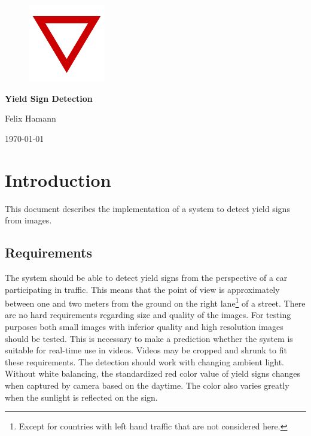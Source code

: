 \documentclass{report}
\begin{document}
%
%


{\centering

  \begin{figure}
    \vspace{3cm}

    \centering
    \includegraphics[width=0.3\textwidth]{src/yield}

    \vspace{4cm}
  \end{figure}


  {\Huge\textbf{Yield Sign Detection}}
  \vspace{.4cm}

  Felix Hamann

  \vspace{.2cm}

  \today

}


%
%

\tableofcontents


\chapter{Introduction}

This document describes the implementation of a system to detect yield
signs from images. {\color{red}{To be written: Some general
    introduction (problem description, scope, constraints, reason)}}

\section{Requirements}

The system should be able to detect yield signs from the perspective
of a car participating in traffic. This means that the point of view
is approximately between one and two meters from the ground on the
right lane\footnote{Except for countries with left hand traffic that
  are not considered here.} of a street. There are no hard
requirements regarding size and quality of the images. For testing
purposes both small images with inferior quality and high resolution
images should be tested. This is necessary to make a prediction
whether the system is suitable for real-time use in videos. Videos may
be cropped and shrunk to fit these requirements. The detection should
work with changing ambient light. Without white balancing, the
standardized red color value of yield signs changes when captured by
camera based on the daytime. The color also varies greatly when the
sunlight is reflected on the sign.
\end{document}
